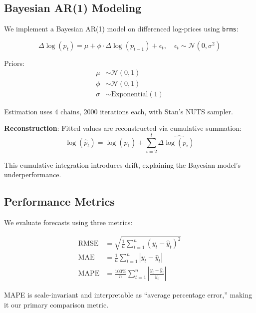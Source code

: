 \documentclass[12pt]{article}
\begin{document}
\subsection{Bayesian AR(1) Modeling}

We implement a Bayesian AR(1) model on differenced log-prices using \texttt{brms}:

\begin{equation}
\Delta \log(p_t) = \mu + \phi \cdot \Delta \log(p_{t-1}) + \epsilon_t, \quad \epsilon_t \sim \mathcal{N}(0, \sigma^2)
\end{equation}

Priors:
\begin{align}
\mu &\sim \mathcal{N}(0, 1) \\
\phi &\sim \mathcal{N}(0, 1) \\
\sigma &\sim \text{Exponential}(1)
\end{align}

Estimation uses 4 chains, 2000 iterations each, with Stan's NUTS sampler.

\textbf{Reconstruction}: Fitted values are reconstructed via cumulative summation:
\begin{equation}
\log(\hat{p}_t) = \log(p_1) + \sum_{i=2}^{t} \Delta \widehat{\log(p_i)}
\end{equation}

This cumulative integration introduces drift, explaining the Bayesian model's underperformance.

\subsection{Performance Metrics}

We evaluate forecasts using three metrics:

\begin{align}
\text{RMSE} &= \sqrt{\frac{1}{n}\sum_{t=1}^{n}(y_t - \hat{y}_t)^2} \\
\text{MAE} &= \frac{1}{n}\sum_{t=1}^{n}|y_t - \hat{y}_t| \\
\text{MAPE} &= \frac{100\%}{n}\sum_{t=1}^{n}\left|\frac{y_t - \hat{y}_t}{y_t}\right|
\end{align}

MAPE is scale-invariant and interpretable as ``average percentage error,'' making it our primary comparison metric.

\newpage

\end{document}
